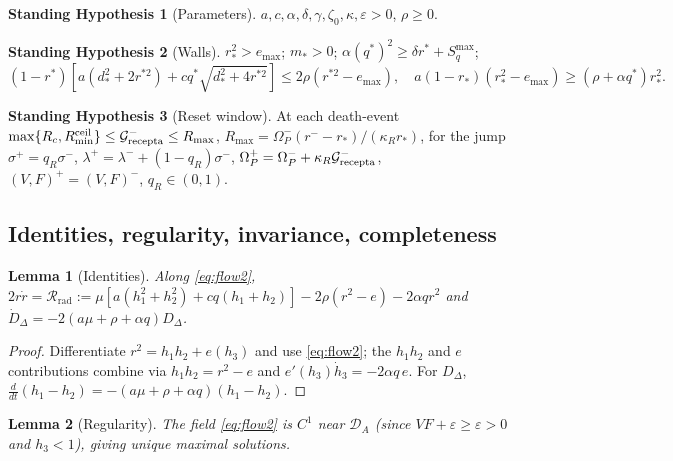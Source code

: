 \documentclass[11pt,a4paper]{article}
\newcommand{\DA}{\mathcal D_A}
\newcommand{\Grec}{\mathcal G_{\rm recepta}}
\newcommand{\Sq}{S_q}
\newcommand{\Om}{\Omega_P}
\newcommand{\Rrad}{\mathcal R_{\mathrm{rad}}}
\theoremstyle{plain}
\newtheorem{lemma}{Lemma}
\theoremstyle{definition}
\newtheorem{assumption}{Standing Hypothesis}
\theoremstyle{remark}
\begin{document}
\begin{assumption}[Parameters]\label{H:paramF}
$a,c,\alpha,\delta,\gamma,\zeta_0,\kappa,\varepsilon>0$, $\rho\ge0$.
\end{assumption}
\begin{assumption}[Walls]\label{H:wallsF}
$r_*^2>e_{\max}$; $m_*>0$; $\alpha(q^*)^2\ge\delta r^*+\Sq^{\max}$;
\begin{equation}
  (1-r^*)\!\left[a(d_*^2+2r^{*2})+cq^*\sqrt{d_*^2+4r^{*2}}\right]\le2\rho(r^{*2}-e_{\max}),
  \quad
  a(1-r_*)(r_*^2-e_{\max})\ge(\rho+\alpha q^*)r_*^2.
\end{equation}
\end{assumption}
\begin{assumption}[Reset window]\label{H:resetF}
At each death-event $\max\{R_c,R^{\mathrm{ceil}}_{\min}\}\le\Grec^-\le R_{\max}$,
$R_{\max}=\Om^-(r^--r_*)/(\kappa_R r_*)$, for the jump
$\sigma^+=q_R\sigma^-$, $\lambda^+=\lambda^-+(1-q_R)\sigma^-$,
$\Om^+=\Om^-+\kappa_R\Grec^-$, $(V,F)^+=(V,F)^-$, $q_R\in(0,1)$.
\end{assumption}

\subsection{Identities, regularity, invariance, completeness}

\begin{lemma}[Identities]\label{lem:identF}
Along \eqref{eq:flow2}, $2r\dot r=\Rrad:=\mu[a(h_1^2+h_2^2)+cq(h_1+h_2)]-2\rho(r^2-e)-2\alpha qr^2$
and $\dot D_\Delta=-2(a\mu+\rho+\alpha q)D_\Delta$.
\end{lemma}
\begin{proof}
Differentiate $r^2=h_1h_2+e(h_3)$ and use \eqref{eq:flow2}; the $h_1h_2$ and
$e$ contributions combine via $h_1h_2=r^2-e$ and $e'(h_3)\dot h_3=-2\alpha q\,e$.
For $D_\Delta$, $\frac{d}{dt}(h_1-h_2)=-(a\mu+\rho+\alpha q)(h_1-h_2)$.
\end{proof}

\begin{lemma}[Regularity]\label{lem:regF}
The field \eqref{eq:flow2} is $C^1$ near $\DA$ (since $VF+\varepsilon\ge\varepsilon>0$
and $h_3<1$), giving unique maximal solutions.
\end{lemma}
\end{document}
